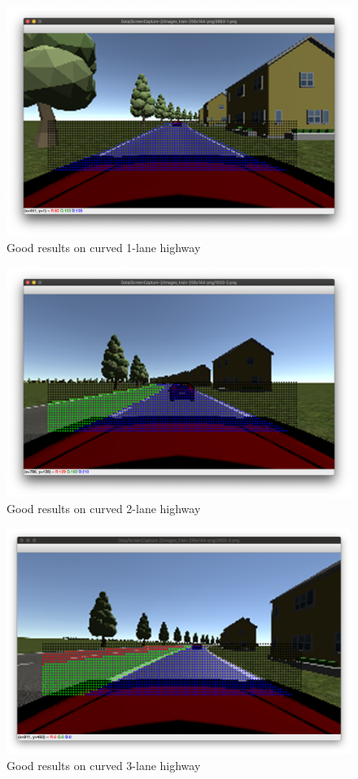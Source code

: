 \begin{figure}[H]
  \centering
  \includegraphics[scale=0.31]{images/Chapter5/lane1-curve-green.png}
  \caption{Good results on curved 1-lane highway}
  \label{fig:good-curve-1}
\end{figure}
\begin{figure}[H]
  \centering
  \includegraphics[scale=0.31]{images/Chapter5/lane2-curve-green.png}
  \caption{Good results on curved 2-lane highway}
  \label{fig:good-curve-2}
\end{figure}
\begin{figure}[H]
  \centering
  \includegraphics[scale=0.31]{images/Chapter5/lane3-curve-green.png}
  \caption{Good results on curved 3-lane highway}
  \label{fig:good-curve-3}
\end{figure}
